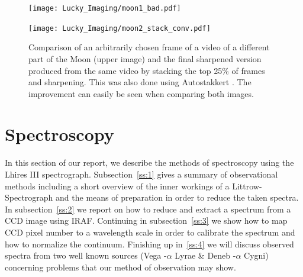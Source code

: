 \documentclass{article}
\begin{document}
\begin{figure}[H]
\centering
\begin{minipage}{1.\textwidth}
\centering
  \texttt{[image: Lucky\_Imaging/moon1\_bad.pdf]}
\end{minipage}
\begin{minipage}{1.\textwidth}
\centering
  \texttt{[image: Lucky\_Imaging/moon2\_stack\_conv.pdf]}
\end{minipage}
    \caption{Comparison of an arbitrarily chosen frame of a video of a different part of the Moon (upper image) and the final sharpened version produced from the same video by stacking the top 25\% of frames and sharpening. This was also done using Autostakkert \parencite{autostakkert}. The improvement can easily be seen when comparing both images.}
    \label{fig:moon_comp_av}
\end{figure}

\section{Spectroscopy}\label{sec:spectrum}
In this section of our report, we describe the methods of spectroscopy using the Lhires III spectrograph. Subsection~\ref{ss:1} gives a summary of observational methods including a short overview of the inner workings of a Littrow-Spectrograph and the means of preparation in order to reduce the taken spectra. In subsection~\ref{ss:2} we report on how to reduce and extract a spectrum from a CCD image using IRAF. Continuing in subsection~\ref{ss:3} we show how to map CCD pixel number to a wavelength scale in order to calibrate the spectrum and how to normalize the continuum. Finishing up in~\ref{ss:4} we will discuss observed spectra from two well known sources (Vega {-}$\alpha$ Lyrae  $\&$ Deneb {-}$\alpha$ Cygni) concerning problems that our method of observation may show. 
\end{document}
